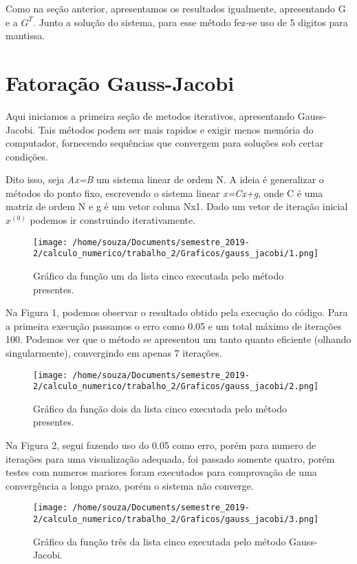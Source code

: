 \documentclass[12pt]{article}
\begin{document}
Como na seção anterior, apresentamos os resultados igualmente, apresentando G e a $G^{T}$. Junto a solução do sistema, para esse método fez-se uso de 5 digitos para mantissa.

\section{Fatoração Gauss-Jacobi}

Aqui iniciamos a primeira seção de metodos iterativos, apresentando Gauss-Jacobi. Tais métodos podem ser mais rapidos e exigir  menos memória do computador, fornecendo sequências que convergem para soluções sob certar condições.

Dito isso, seja \textit{Ax=B} um sistema linear de ordem N. A ideia é generalizar o métodos do ponto fixo, escrevendo o sistema linear \textit{x=Cx+g}, onde C é uma matriz de ordem N e g é um vetor coluna Nx1. Dado um vetor de iteração inicial $x^{(0)}$ podemos ir construindo iterativamente. 

\begin{figure}[!h]
    \centering
    \texttt{[image: /home/souza/Documents/semestre\_2019-2/calculo\_numerico/trabalho\_2/Graficos/gauss\_jacobi/1.png]}
    \caption{Gráfico da função um da lista cinco executada pelo método presentes.}
\end{figure}

Na Figura 1, podemos observar o resultado obtido pela execução do código. Para a primeira execução passamos o erro como 0.05 e um total máximo de iterações 100. Podemos ver que o método se apresentou um tanto quanto eficiente (olhando singularmente), convergindo em apenas 7 iterações.

\begin{figure}[!h]
    \centering
    \texttt{[image: /home/souza/Documents/semestre\_2019-2/calculo\_numerico/trabalho\_2/Graficos/gauss\_jacobi/2.png]}
    \caption{Gráfico da função dois da lista cinco executada pelo método presentes.}
\end{figure}

Na Figura 2, segui fazendo uso do 0.05 como erro, porém para numero de iterações para uma visualização adequada, foi passado somente quatro, porém testes com numeros mariores foram executados para comprovação de uma convergência a longo prazo, porém o sistema não converge.

\begin{figure}[!h]
    \centering
    \texttt{[image: /home/souza/Documents/semestre\_2019-2/calculo\_numerico/trabalho\_2/Graficos/gauss\_jacobi/3.png]}
    \caption{Gráfico da função três da lista cinco executada pelo método Gauss-Jacobi.}
\end{figure}
\end{document}
